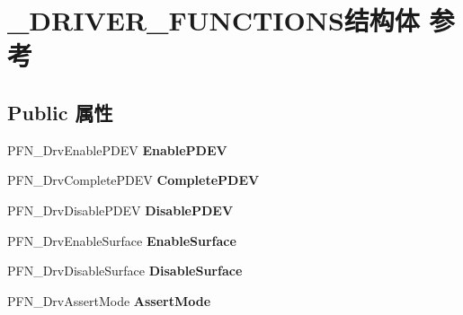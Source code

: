 \hypertarget{struct___d_r_i_v_e_r___f_u_n_c_t_i_o_n_s}{}\section{\+\_\+\+D\+R\+I\+V\+E\+R\+\_\+\+F\+U\+N\+C\+T\+I\+O\+N\+S结构体 参考}
\label{struct___d_r_i_v_e_r___f_u_n_c_t_i_o_n_s}
\subsection*{Public 属性}
\begin{DoxyCompactItemize}
\item 
\mbox{\label{struct___d_r_i_v_e_r___f_u_n_c_t_i_o_n_s_acb4dce24d66ec16333ab6cce76955ba6}} 
P\+F\+N\+\_\+\+Drv\+Enable\+P\+D\+EV {\bfseries Enable\+P\+D\+EV}
\item 
\mbox{\label{struct___d_r_i_v_e_r___f_u_n_c_t_i_o_n_s_a6c5750b700c44cc174bdcf3bcccef4f4}} 
P\+F\+N\+\_\+\+Drv\+Complete\+P\+D\+EV {\bfseries Complete\+P\+D\+EV}
\item 
\mbox{\label{struct___d_r_i_v_e_r___f_u_n_c_t_i_o_n_s_a7a3b5934608494210ca9595fc8a4f82a}} 
P\+F\+N\+\_\+\+Drv\+Disable\+P\+D\+EV {\bfseries Disable\+P\+D\+EV}
\item 
\mbox{\label{struct___d_r_i_v_e_r___f_u_n_c_t_i_o_n_s_a9f22ef4f84ceec425cc539c85fbaa3d9}} 
P\+F\+N\+\_\+\+Drv\+Enable\+Surface {\bfseries Enable\+Surface}
\item 
\mbox{\label{struct___d_r_i_v_e_r___f_u_n_c_t_i_o_n_s_a45c0b38ec8ed393c2a4f6f3b7af44582}} 
P\+F\+N\+\_\+\+Drv\+Disable\+Surface {\bfseries Disable\+Surface}
\item 
\mbox{\label{struct___d_r_i_v_e_r___f_u_n_c_t_i_o_n_s_a7bf10995690a8807a5f89905834f4805}} 
P\+F\+N\+\_\+\+Drv\+Assert\+Mode {\bfseries Assert\+Mode}
\item 
\mbox{\label{struct___d_r_i_v_e_r___f_u_n_c_t_i_o_n_s_ab97262da56a0d62013c13e9139c26f81}} 

\end{DoxyCompactItemize}

